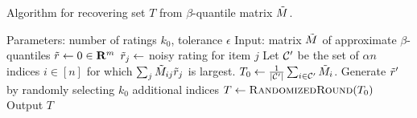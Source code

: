 \begin{algorithm}[t!]
\caption{Algorithm for recovering set $T$ from $\beta$-quantile matrix $\tilde{M}$.}
\label{alg:recover-T}
\begin{algorithmic}[1]
\State Parameters: number of ratings $k_0$, tolerance $\epsilon$
\State Input: matrix $\tilde{M}$ of approximate $\beta$-quantiles
\State $\tilde{r} \gets 0 \in \mathbf{R}^m$
\State $\tilde{r}_j \gets $ noisy rating for item $j$
\EndFor
\State Let $\mathcal{C}'$ be the set of $\alpha n$ indices $i \in [n]$ for which 
       $\sum_j \tilde{M}_{ij}\tilde{r}_j$ is largest.
\State $T_0 \gets \frac{1}{|\mathcal{C}'|} \sum_{i \in \mathcal{C}'} \tilde{M}_i$. 
\State Generate $\tilde{r}'$ by randomly selecting $k_0$ additional indices
\State $T \gets \textsc{RandomizedRound}(T_0)$ 
\State Output $T$
\EndIf
\EndWhile
\end{algorithmic}
\end{algorithm}
